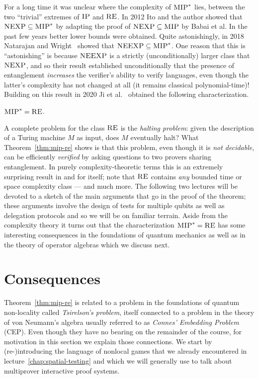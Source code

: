 For a long time it was unclear where the complexity of $\textsc{MIP}^*$ lies, between the two ``trivial'' extremes of $\textsc{IP}$ and $\textsc{RE}$. In 2012 Ito and the author showed that $\textsc{NEXP} \subseteq \textsc{MIP}^*$ by adapting the proof of $\textsc{NEXP} \subseteq \textsc{MIP}$ by Babai et al. In the past few years better lower bounds were obtained. Quite astonishingly, in 2018 Natarajan and Wright~\cite{natarajan2019neexp} showed that $\textsc{NEEXP} \subseteq \textsc{MIP}^*$. One reason that this is ``astonishing'' is because $\textsc{NEEXP}$ is a strictly (unconditionally) larger class that $\textsc{NEXP}$, and so their result established unconditionally that the presence of entanglement \emph{increases} the verifier's ability to verify languages, even though the latter's complexity has not changed at all (it remains classical polynomial-time)! Building on this result in 2020 Ji et al.~\cite{ji2020mip} obtained the following characterization. 

\begin{theorem}\label{thm:mip-re}
$\textsc{MIP}^* = \textsc{RE}$. 
\end{theorem}

A complete problem for the class $\textsc{RE}$ is the \emph{halting problem}: given the description of a Turing machine $M$ as input, does $M$ eventually halt? What Theorem~\ref{thm:mip-re} shows is that this problem, even though it is \emph{not decidable}, can be efficiently \emph{verified} by asking questions to two provers sharing entanglement. In purely complexity-theoretic terms this is an extremely surprising result in and for itself; note that $\textsc{RE}$ contains \emph{any} bounded time or space complexity class --- and much more. The following two lectures will be devoted to a sketch of the main arguments that go in the proof of the theorem; these arguments involve the design of tests for multiple qubits as well as delegation protocols and so we will be on familiar terrain. Aside from the complexity theory it turns out that the characterization $\textsc{MIP}^* = \textsc{RE}$ has some interesting consequences in the foundations of quantum mechanics as well as in the theory of operator algebras which we discuss next. 

\section{Consequences}

Theorem~\ref{thm:mip-re} is related to a problem in the foundations of quantum non-locality called \emph{Tsirelson's problem}, itself connected to a problem in the theory of von Neumann's algebra usually referred to as \emph{Connes' Embedding Problem} (CEP). Even though they have no bearing on the remainder of the course, for motivation in this section we explain those connections. We start by (re-)introducing the language of nonlocal games that we already encountered in lecture~\ref{chap:spatial-testing} and which we will generally use to talk about multiprover interactive proof systems.  

